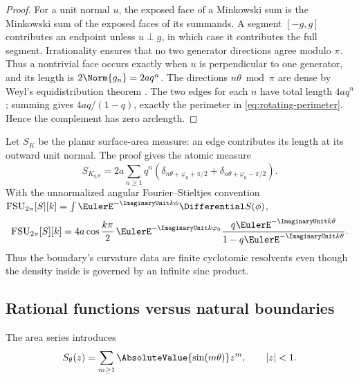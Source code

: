 \documentclass[11pt,oneside]{article}
\theoremstyle{definition}
\theoremstyle{remark}
\newcommand{\AngularFourierStieltjesCoefficient}[2]{\operatorname{FSU}_{2\pi}\!\left[#1\right]\!\left[#2\right]}
\begin{document}
\begin{proof}
For a unit normal $u$, the exposed face of a Minkowski sum is the Minkowski sum
of the exposed faces of its summands.  A segment $[-g,g]$ contributes an endpoint
unless $u\perp g$, in which case it contributes the full segment.  Irrationality
ensures that no two generator directions agree modulo $\pi$.  Thus a nontrivial
face occurs exactly when $u$ is perpendicular to one generator, and its length is
$2\Norm{g_n}=2aq^n$.  The directions $n\theta\bmod\pi$ are dense by Weyl's
equidistribution theorem \cite{Weyl}.  The two edges for each $n$ have total
length $4aq^n$; summing gives $4aq/(1-q)$, exactly the perimeter in
\eqref{eq:rotating-perimeter}.  Hence the complement has zero arclength.
\end{proof}

Let $S_K$ be the planar surface-area measure: an edge contributes its length at
its outward unit normal.  The proof gives the atomic measure
\begin{equation}
 S_{K_{q,\theta}}
 =2a\sum_{n\ge1}q^n
 \left(\delta_{n\theta+\varphi_0+\pi/2}
      +\delta_{n\theta+\varphi_0-\pi/2}\right).
 \label{eq:surface-measure}
\end{equation}
With the unnormalized angular Fourier--Stieltjes convention
$\AngularFourierStieltjesCoefficient{S}{k}
=\int\EulerE^{-\ImaginaryUnit k\phi}\Differential S(\phi)$,
\begin{equation}
 \AngularFourierStieltjesCoefficient{S}{k}
 =4a\cos\frac{k\pi}{2}\,
  \EulerE^{-\ImaginaryUnit k\varphi_0}
  \frac{q\EulerE^{-\ImaginaryUnit k\theta}}{1-q\EulerE^{-\ImaginaryUnit k\theta}}.
 \label{eq:surface-fourier}
\end{equation}
Thus the boundary's curvature data are finite cyclotomic resolvents even though
the density inside is governed by an infinite sinc product.

\subsection{Rational functions versus natural boundaries}

The area series introduces
\begin{equation}
 S_\theta(z)=\sum_{m\ge1}\AbsoluteValue{\sin(m\theta)}z^m,
 \qquad |z|<1.
 \label{eq:area-series}
\end{equation}
\end{document}
